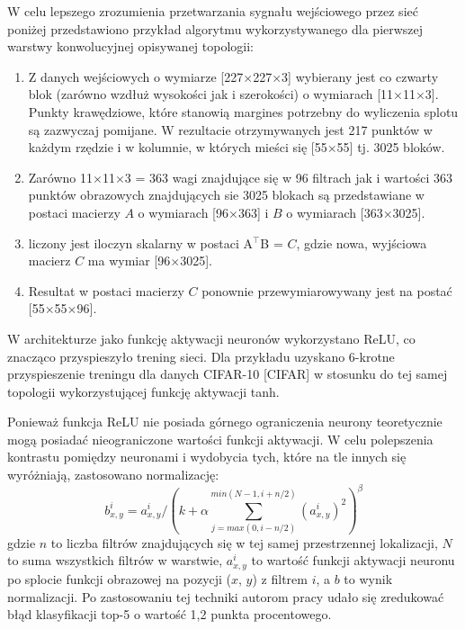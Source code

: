 W celu lepszego zrozumienia przetwarzania sygnału wejściowego przez sieć poniżej przedstawiono przykład algorytmu wykorzystywanego dla pierwszej warstwy konwolucyjnej opisywanej topologii: 
\begin{enumerate}
\item Z danych wejściowych o wymiarze [227$\times$227$\times$3] wybierany jest co czwarty blok (zarówno wzdłuż wysokości jak i szerokości) o wymiarach [11$\times$11$\times$3]. Punkty krawędziowe, które stanowią margines potrzebny do wyliczenia splotu są zazwyczaj pomijane. W rezultacie otrzymywanych jest 217 punktów w każdym rzędzie i w kolumnie, w których mieści się [55$\times$55] tj. 3025 bloków.
\item Zarówno 11$\times$11$\times$3 = 363 wagi znajdujące się w 96 filtrach jak i wartości 363 punktów obrazowych znajdujących sie 3025 blokach są przedstawiane w postaci macierzy $A$ o wymiarach [96$\times$363] i $B$ o wymiarach [363$\times$3025].
\item liczony jest iloczyn skalarny w postaci A$^\intercal$B = $C$, gdzie nowa, wyjściowa macierz $C$ ma wymiar [96$\times$3025].
\item Resultat w postaci macierzy $C$ ponownie przewymiarowywany jest na postać [55$\times$55$\times$96].  
\end{enumerate} 

W architekturze jako funkcję aktywacji neuronów wykorzystano ReLU, co znacząco przyspieszyło trening sieci. Dla przykładu uzyskano 6-krotne przyspieszenie treningu dla danych CIFAR-10 [CIFAR] w stosunku do tej samej topologii wykorzystującej funkcję aktywacji tanh.

Ponieważ funkcja ReLU nie posiada górnego ograniczenia neurony teoretycznie mogą posiadać nieograniczone wartości funkcji aktywacji. W celu polepszenia kontrastu pomiędzy neuronami i wydobycia tych, które na tle innych się wyróżniają, zastosowano normalizację:
\begin{equation}
b^i_{x,y} = a^i_{x,y}/\left ( k + \alpha \sum_{j=max(0,i-n/2)}^{min(N-1,i+n/2)} (a^i_{x,y})^2 \right  )^\beta 
\label{AlexNetNorm}
\end{equation}
gdzie $n$ to liczba filtrów znajdujących się w tej samej przestrzennej lokalizacji, $N$ to suma wszystkich filtrów w warstwie, $a^i_{x,y}$ to wartość funkcji aktywacji neuronu po splocie funkcji obrazowej na pozycji ($x$, $y$) z filtrem $i$, a $b$ to wynik normalizacji. Po zastosowaniu tej techniki autorom pracy udało się zredukować błąd klasyfikacji top-5 o wartość 1,2 punkta procentowego.


